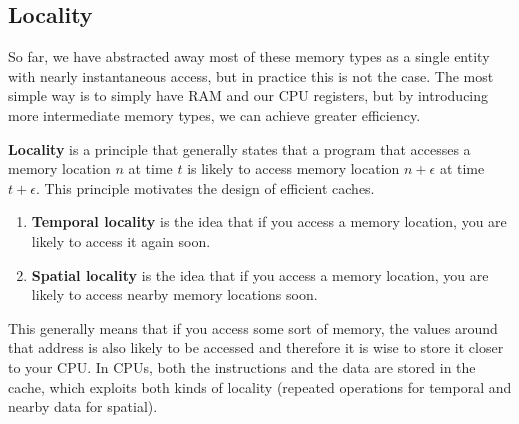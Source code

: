 \documentclass{article}
\begin{document}
  \subsection{Locality}

    So far, we have abstracted away most of these memory types as a single entity with nearly instantaneous access, but in practice this is not the case. The most simple way is to simply have RAM and our CPU registers, but by introducing more intermediate memory types, we can achieve greater efficiency. 

    \begin{definition}[Locality]
      \textbf{Locality} is a principle that generally states that a program that accesses a memory location $n$ at time $t$ is likely to access memory location $n + \epsilon$ at time $t + \epsilon$. This principle motivates the design of efficient caches. 
      \begin{enumerate}
        \item \textbf{Temporal locality} is the idea that if you access a memory location, you are likely to access it again soon. 
        \item \textbf{Spatial locality} is the idea that if you access a memory location, you are likely to access nearby memory locations soon.
      \end{enumerate}
      This generally means that if you access some sort of memory, the values around that address is also likely to be accessed and therefore it is wise to store it closer to your CPU. In CPUs, both the instructions and the data are stored in the cache, which exploits both kinds of locality (repeated operations for temporal and nearby data for spatial). 
    \end{definition}
\end{document}

